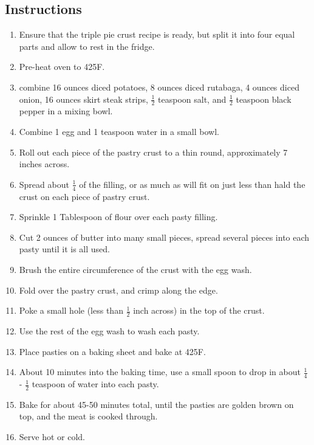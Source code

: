 \begin{multicols}{2}
\subsection*{Instructions}
\begin{enumerate}
    \item Ensure that the triple pie crust recipe is ready, but split it into four equal parts and allow to rest in the fridge.
    \item Pre-heat oven to 425F.
    \item combine 16 ounces diced potatoes, 8 ounces diced rutabaga, 4 ounces diced onion, 16 ounces skirt steak strips, \( \frac{1}{2} \) teaspoon salt, and \( \frac{1}{2} \) teaspoon black pepper in a mixing bowl.
    \item Combine 1 egg and 1 teaspoon water in a small bowl.
    \item Roll out each piece of the pastry crust to a thin round, approximately 7 inches across.
    \item Spread about \( \frac{1}{4} \) of the filling, or as much as will fit on just less than hald the crust on each piece of pastry crust.
    \item Sprinkle 1 Tablespoon of flour over each pasty filling.
    \item Cut 2 ounces of butter into many small pieces, spread several pieces into each pasty until it is all used.
    \item Brush the entire circumference of the crust with the egg wash.
    \item Fold over the pastry crust, and crimp along the edge.
    \item Poke a small hole (less than \( \frac{1}{2} \) inch across) in the top of the crust.
    \item Use the rest of the egg wash to wash each pasty.
    \item Place pasties on a baking sheet and bake at 425F.
    \item About 10 minutes into the baking time, use a small spoon to drop in about \( \frac{1}{4} \) - \( \frac{1}{2} \) teaspoon of water into each pasty.
    \item Bake for about 45-50 minutes total, until the pasties are golden brown on top, and the meat is cooked through.
    \item Serve hot or cold.
\end{enumerate}


\end{multicols}
